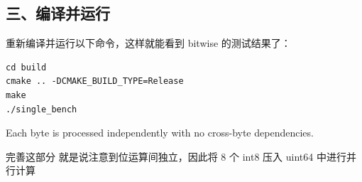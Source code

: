 \documentclass[11pt, a4paper]{article}
\begin{document}
\begin{aibox}
\subsection*{三、编译并运行}

重新编译并运行以下命令，这样就能看到 bitwise 的测试结果了：

\begin{tcolorbox}[colback=white,colframe=gray!50!white,boxrule=0.5pt,arc=2pt,left=5pt,right=5pt,top=5pt,bottom=5pt]
\begin{verbatim}
cd build
cmake .. -DCMAKE_BUILD_TYPE=Release
make
./single_bench
\end{verbatim}
\end{tcolorbox}

\end{aibox}

\vspace{1.5em}

\begin{userbox}
\noindent Each byte is processed independently with no cross-byte dependencies.

完善这部分 就是说注意到位运算间独立，因此将 8 个 int8 压入 uint64 中进行并行计算
\end{userbox}
\end{document}
